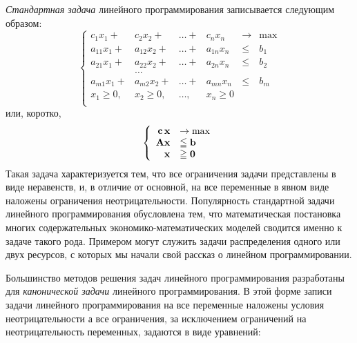 \emph{Стандартная задача} линейного программирования записывается
следующим образом:
\begin{equation} \label{SZLP}
\left\{
\begin{array}{rrrrllll}
     c_1 x_1 + & c_2 x_2 +    & \ldots +& c_n x_n &\to & \max\\
     a_{11} x_1 + & a_{12} x_2 + &\ldots +& a_{1n} x_n &\leqslant& b_1 \\
     a_{21} x_1 + & a_{22} x_2 + &\ldots +& a_{2n} x_n &\leqslant& b_2\\
                      & \ldots &&&&\\
     a_{m1} x_1 + & a_{m2} x_2 +& \ldots +& a_{mn} x_n &\leqslant& b_m\\
     x_1 \geqslant 0,   & x_2 \geqslant 0,  & \ldots,&  x_n \geqslant 0\\
\end{array} \right.
\end{equation}
или, коротко,
\begin{equation}\label{SZLPV}
\left\{
\begin{array}{rl}
 \mathbf{c} \, \mathbf{x} & \to \max  \\
 \mathbf{A} \mathbf{x} &\leqq \mathbf{b} \\
 \mathbf{x} &\geqq \mathbf{0}\\
\end{array} \right.
\end{equation}
Такая задача характеризуется тем, что все ограничения задачи
представлены в виде неравенств, и, в отличие от основной,  на все
переменные в явном виде наложены ограничения неотрицательности.
Популярность стандартной задачи линейного программирования
обусловлена тем, что математическая постановка многих содержательных
экономико-математических моделей сводится именно к задаче такого
рода. Примером могут служить задачи распределения одного или двух
ресурсов, с которых мы начали свой рассказ о линейном
программировании.





Большинство методов решения задач линейного программирования
разработаны для \emph{канонической задачи} линейного
программирования. В этой форме записи задачи линейного
программирования на все переменные наложены условия
неотрицательности а все ограничения, за исключением ограничений на
неотрицательность переменных, задаются в виде уравнений:


